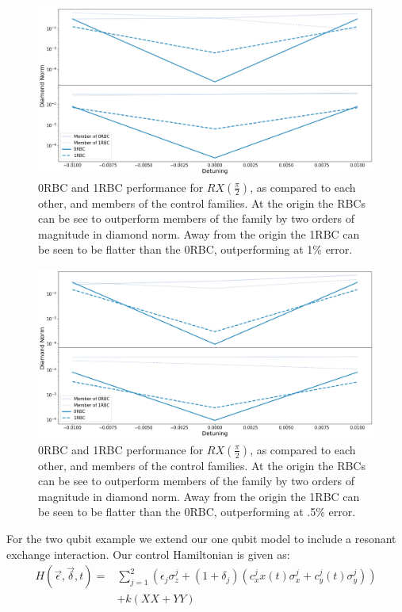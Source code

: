 \documentclass[aps,nofootinbib,pra,notitlepage,twocolumn]{revtex4-1}
\begin{document}
\begin{figure}[htb]
  \centering
  \includegraphics[scale=.2]{figures/SQRTX}

\caption{0RBC and 1RBC performance for $RX(\frac{\pi}{2})$, as compared to each other, and members of the control families. At the origin the RBCs can be see to outperform members of the family by two orders of magnitude in diamond norm. Away from the origin the 1RBC can be seen to be flatter than the 0RBC, outperforming at 1\% error.}
\end{figure}
\begin{figure}[htb]
  \centering
  \includegraphics[scale=.2]{figures/SQRTY}
\caption{0RBC and 1RBC performance for $RX(\frac{\pi}{2})$, as compared to each other, and members of the control families. At the origin the RBCs can be see to outperform members of the family by two orders of magnitude in diamond norm. Away from the origin the 1RBC can be seen to be flatter than the 0RBC, outperforming at .5\% error.}
\end{figure}

For the two qubit example we extend our one qubit model to include a resonant exchange interaction. Our control Hamiltonian is given as:
\begin{equation} \label{eq:2Qham}
\begin{split}
H(\vec{\epsilon}, \vec{\delta}, t) = &\sum_{j=1}^2(\epsilon_j\sigma_z^j + (1 + \delta_j)(c_x^jx(t)\sigma_x^j + c_y^j(t)\sigma_y^j)) \\
&+ k(XX + YY)
\end{split}
\end{equation}
\end{document}
